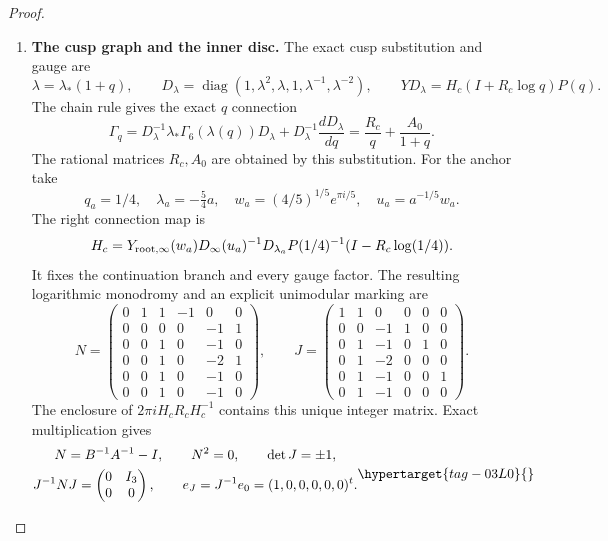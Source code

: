 \begin{proof}
\begin{enumerate}[label={$\langle1\rangle$\arabic*.}]
A second program reconstructs every rectangle from its quadtree address, checks that the leaves partition the four seed regions (of areas $2401/2500$, $2401/2500$, $1/8$ and $10609/10000$) and rechecks every exclusion and every strict comparison.

\item \textbf{The cusp graph and the inner disc.}
The exact cusp substitution and gauge are
\[
 \lambda=\lambda_*(1+q),\qquad
 D_\lambda=\operatorname{diag}(1,\lambda^2,\lambda,1,
                                  \lambda^{-1},\lambda^{-2}),
 \qquad YD_\lambda=H_c(I+R_c\log q)P(q).
\]
The chain rule gives the exact $q$ connection
\[
 \Gamma_q=D_\lambda^{-1}\lambda_*\Gamma_6(\lambda(q))D_\lambda
           +D_\lambda^{-1}\frac{dD_\lambda}{dq}
          =\frac{R_c}{q}+\frac{A_0}{1+q}.
\]
The rational matrices $R_c,A_0$ are obtained by this substitution.
For the anchor take
\[
 q_a=1/4,\quad\lambda_a=-\tfrac54a,\quad
 w_a=(4/5)^{1/5}e^{\pi i/5},\quad u_a=a^{-1/5}w_a.
\]
The right connection map is
\[
 H_c=Y_{\rm root,\infty}(w_a)
       D_\infty(u_a)^{-1}D_{\lambda_a}
       P(1/4)^{-1}(I-R_c\log(1/4)).
\]
It fixes the continuation branch and every gauge factor.
The resulting logarithmic monodromy and an explicit unimodular
marking are
\[
 N=\begin{pmatrix}
 0&1&1&-1&0&0\\0&0&0&0&-1&1\\0&0&1&0&-1&0\\
 0&0&1&0&-2&1\\0&0&1&0&-1&0\\0&0&1&0&-1&0
 \end{pmatrix},\qquad
 J=\begin{pmatrix}
 1&1&0&0&0&0\\0&0&-1&1&0&0\\0&1&-1&0&1&0\\
 0&1&-2&0&0&0\\0&1&-1&0&0&1\\0&1&-1&0&0&0
 \end{pmatrix}.
\]
The enclosure of $2\pi iH_cR_cH_c^{-1}$ contains this unique
integer matrix. Exact multiplication gives
\[
 \begin{gathered}
 N=B^{-1}A^{-1}-I,\qquad N^2=0,\qquad\det J=\pm1,\\
 J^{-1}NJ=\begin{pmatrix}0&I_3\\0&0\end{pmatrix},\qquad
 e_J=J^{-1}e_0=(1,0,0,0,0,0)^t.
 \end{gathered}\hypertarget{tag-03L0}{}\label{layout:V:fresh-marking}
\]
\end{enumerate}
\end{proof}
